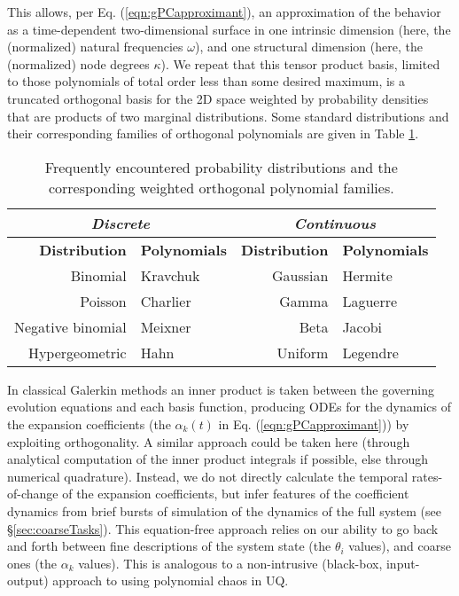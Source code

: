 \documentclass[numbers]{frontiersSCNS}
\newcommand{\degree}{\kappa}
\newcommand{\eqnRef}[1]{Eq. (\ref{eqn:#1})}
\newcommand{\secRef}[1]{\S\ref{sec:#1}}
\newcommand{\scalarFuncIndex}{k}
\begin{document}
This allows, per \eqnRef{gPCapproximant}, an approximation of the behavior as a time-dependent two-dimensional surface
in one intrinsic dimension (here, the (normalized) natural frequencies $\omega$),
and one structural dimension (here, the (normalized) node degrees $\degree$).
%
We repeat 
%
that this tensor product basis,
limited to those polynomials of total order less than some desired maximum,
is a truncated orthogonal basis for the 2D space
weighted by probability densities that are products of two marginal distributions.
%
Some standard distributions and their
corresponding families of orthogonal polynomials \cite{Xiu2010}
are given in Table \ref{tab:orthoPolys}.
%
\begin{table}[htbp]
\centering
\begin{tabular}{rlrl}
\multicolumn{2}{c}{\textit{Discrete}}
&
\multicolumn{2}{c}{\textit{Continuous}}
\\ \hline
\textbf{Distribution} & \textbf{Polynomials} & \textbf{Distribution} & \textbf{Polynomials}
\\ \hline
Binomial            & Kravchuk  & Gaussian  & Hermite \\
Poisson             & Charlier  & Gamma     & Laguerre \\
Negative binomial   & Meixner   & Beta      & Jacobi  \\
Hypergeometric      & Hahn      & Uniform   & Legendre
\\ \hline
\end{tabular}
\caption{Frequently encountered probability distributions
and the corresponding weighted orthogonal polynomial families.}
\label{tab:orthoPolys}
\end{table}


In classical Galerkin methods
an inner product is taken between the governing evolution equations and each basis function,
producing ODEs for the dynamics of the expansion coefficients 
(the $\alpha_{\scalarFuncIndex}(t)$ in \eqnRef{gPCapproximant}) by exploiting orthogonality.
%
A similar approach could be taken here
(through analytical computation of the inner product integrals if possible,
else through numerical quadrature).
%
Instead, we do not directly calculate
the temporal rates-of-change of the expansion coefficients,
but infer features of the coefficient dynamics
from brief bursts of simulation of the dynamics of the full system
(see \secRef{coarseTasks}).
%
This equation-free approach relies on our ability to go back and forth between
fine descriptions of the system state (the $\theta_i$ values),
and coarse ones (the $\alpha_{\scalarFuncIndex}$ values).
%
This is analogous to a non-intrusive (black-box, input-output) approach
to using polynomial chaos in UQ.
\end{document}
